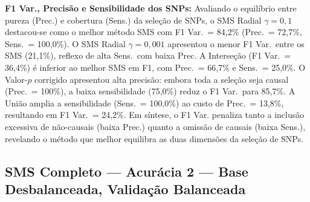 \documentclass[12pt,a4paper]{article}
\newcommand{\novo}[1]{\textcolor{corNova}{#1}}
\begin{document}
\novo{\textbf{F1 Var., Precisão e Sensibilidade dos SNPs:} Avaliando o equilíbrio entre pureza (Prec.) e cobertura (Sens.) da seleção de SNPs, o SMS Radial $\gamma=0{,}1$ destacou-se como o melhor método SMS com F1 Var.\ = 84,2\% (Prec.\ = 72,7\%, Sens.\ = 100,0\%). O SMS Radial $\gamma=0{,}001$ apresentou o menor F1 Var.\ entre os SMS (21,1\%), reflexo de alta Sens.\ com baixa Prec. A Interseção (F1 Var.\ = 36,4\%) é inferior ao melhor SMS em F1, com Prec.\ = 66,7\% e Sens.\ = 25,0\%. O Valor-$p$ corrigido apresentou alta precisão: embora toda a seleção seja causal (Prec.\ = 100\%), a baixa sensibilidade (75,0\%) reduz o F1 Var.\ para 85,7\%. A União amplia a sensibilidade (Sens.\ = 100,0\%) ao custo de Prec.\ = 13,8\%, resultando em F1 Var.\ = 24,2\%. Em síntese, o F1 Var. penaliza tanto a inclusão excessiva de não-causais (baixa Prec.) quanto a omissão de causais (baixa Sens.), revelando o método que melhor equilibra as duas dimensões da seleção de SNPs.}
\subsection{SMS Completo --- Acurácia 2 --- Base Desbalanceada, Validação Balanceada}
\end{document}
